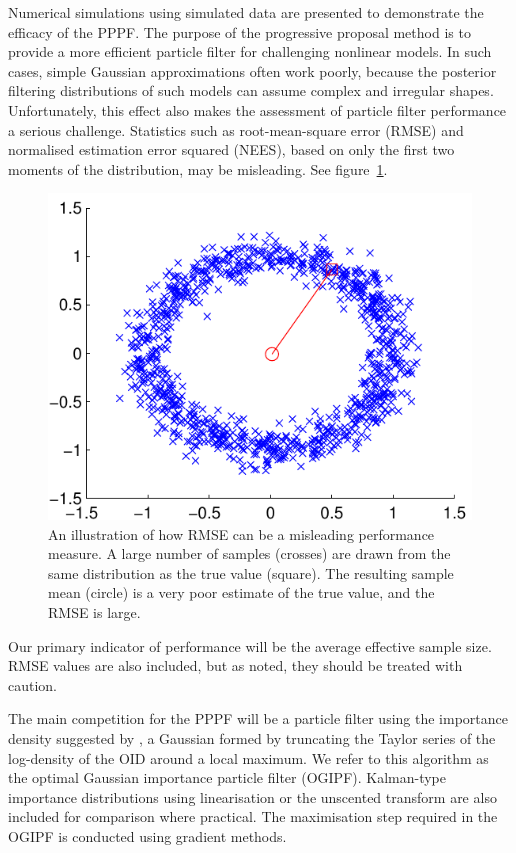 \documentclass{article}
\begin{document}
Numerical simulations using simulated data are presented to demonstrate the efficacy of the PPPF. The purpose of the progressive proposal method is to provide a more efficient particle filter for challenging nonlinear models. In such cases, simple Gaussian approximations often work poorly, because the posterior filtering distributions of such models can assume complex and irregular shapes. Unfortunately, this effect also makes the assessment of particle filter performance a serious challenge. Statistics such as root-mean-square error (RMSE) and normalised estimation error squared (NEES), based on only the first two moments of the distribution, may be misleading. See figure~\ref{fig:rmse_fail}.
%
\begin{figure}
\centering
\includegraphics[width=0.7\columnwidth]{rmse_fail.pdf}
\caption{An illustration of how RMSE can be a misleading performance measure. A large number of samples (crosses) are drawn from the same distribution as the true value (square). The resulting sample mean (circle) is a very poor estimate of the true value, and the RMSE is large.}
\label{fig:rmse_fail}
\end{figure}

Our primary indicator of performance will be the average effective sample size. RMSE values are also included, but as noted, they should be treated with caution.

The main competition for the PPPF will be a particle filter using the importance density suggested by \citet{Doucet2000a}, a Gaussian formed by truncating the Taylor series of the log-density of the OID around a local maximum. We refer to this algorithm as the optimal Gaussian importance particle filter (OGIPF). Kalman-type importance distributions using linearisation or the unscented transform are also included for comparison where practical. The maximisation step required in the OGIPF is conducted using gradient methods.
\end{document}
